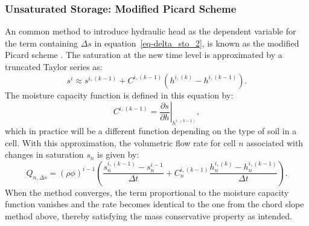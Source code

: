 \documentclass[fleqn]{article}
\begin{document}
\subsubsection*{Unsaturated Storage: Modified Picard Scheme}
An common method to introduce hydraulic head as the dependent
variable for the term containing $\Delta s$ in 
equation~\ref{eq-delta_sto_2}, is known as the modified Picard
scheme \cite{celia-1990}. The saturation at the new time
level is approximated by a truncated Taylor series as:
\begin{equation}
  s^i \approx s^{i,(k-1)} + 
    C^{i,(k-1)}
    \left( h^{i,(k)} - h^{i,(k-1)} \right).
\end{equation}
The moisture capacity function is defined in this equation by:
\begin{equation}
  C^{i,(k-1)} = 
    \left. \frac{\partial s}{\partial h}\right|_{h^{i,(k-1)}},
\end{equation}
which in practice will be a different function depending on
the type of soil in a cell. With this approximation, the volumetric
flow rate for cell $n$ associated with changes in saturation $s_n$ is
given by:
\begin{equation}
  Q_{n,\Delta s} = (\rho \phi)^{i-1}
    \left( 
      \frac{s_n^{i,(k-1)} - s_n^{i-1}}{\Delta t} +
      C_n^{i,(k-1)}
      \frac{h_n^{i,(k)} - h_n^{i,(k-1)}}{\Delta t}
    \right).
\end{equation}
When the method converges, the term proportional to the moisture
capacity function vanishes and the rate becomes identical to the
one from the chord slope method above, thereby satisfying the mass 
conservative property as intended.
\end{document}

